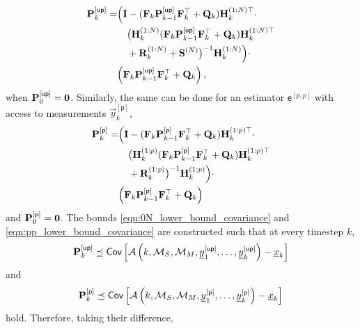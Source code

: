 \documentclass[conference]{IEEEtran}
\theoremstyle{definition}
\theoremstyle{remark}
\begin{document}
\begin{equation}\label{eqn:0N_lower_bound_covariance}
  \begin{split}
    \mat{P}_k^{[\mathsf{up}]} =& \Bigl( \mat{I} - (\mat{F}_k\mat{P}_{k-1}^{[\mathsf{up}]}\mat{F}_k^\top + \mat{Q}_k)\mat{H}_k^{(1:N)\top} \cdot \\
    &\quad\bigl(\mat{H}_k^{(1:N)}(\mat{F}_k\mat{P}_{k-1}^{[\mathsf{up}]}\mat{F}_k^\top + \mat{Q}_k)\mat{H}_k^{(1:N)\top} \\
    &\quad+ \mat{R}_k^{(1:N)} + \mat{S}^{(N)}\bigr)^{-1}\mat{H}_k^{(1:N)}\Bigr)\cdot\\
    &\Bigl(\mat{F}_k\mat{P}_{k-1}^{[\mathsf{up}]}\mat{F}_k^\top + \mat{Q}_k\Bigr)\,,
 \end{split}
\end{equation}
when ${{\mathbf{P}}}_0^{[\mathsf{up}]}={{\mathbf{0}}}$. Similarly, the same can be done for an estimator $\mathsf{e}^{[p,p]}$ with access to measurements $\vec{y}_k^{[\mathsf{p}]}$,
\begin{equation}\label{eqn:pp_lower_bound_covariance}
  \begin{split}
    \mat{P}_k^{[\mathsf{p}]} =& \Bigl( \mat{I} - (\mat{F}_k\mat{P}_{k-1}^{[\mathsf{p}]}\mat{F}_k^\top + \mat{Q}_k)\mat{H}_k^{(1:p)\top} \cdot \\
    &\quad\bigl(\mat{H}_k^{(1:p)}(\mat{F}_k\mat{P}_{k-1}^{[\mathsf{p}]}\mat{F}_k^\top + \mat{Q}_k)\mat{H}_k^{(1:p)\top} \\
    &\quad+ \mat{R}_k^{(1:p)}\bigr)^{-1}\mat{H}_k^{(1:p)}\Bigr)\cdot\\
    &\Bigl(\mat{F}_k\mat{P}_{k-1}^{[\mathsf{p}]}\mat{F}_k^\top + \mat{Q}_k\Bigr)
  \end{split}
\end{equation}
and ${{\mathbf{P}}}_0^{[\mathsf{p}]}={{\mathbf{0}}}$. The bounds \eqref{eqn:0N_lower_bound_covariance} and \eqref{eqn:pp_lower_bound_covariance} are constructed such that at every timestep $k$,
\begin{equation}
  {\ensuremath{{\mathbf{P}}}}_k^{[\mathsf{up}]} \preceq \mathsf{Cov}\left[\mathcal{A}\left(k,\mathcal{M}_S,\mathcal{M}_M,{\underline{y}}_1^{[\mathsf{up}]},\dots,{\underline{y}}_k^{[\mathsf{up}]}\right) - {\underline{x}}_k\right]
\end{equation}
and
\begin{equation}
  {\ensuremath{{\mathbf{P}}}}_k^{[\mathsf{p}]} \preceq \mathsf{Cov}\left[\mathcal{A}\left(k,\mathcal{M}_S,\mathcal{M}_M,{\underline{y}}_1^{[\mathsf{p}]},\dots,{\underline{y}}_k^{[\mathsf{p}]}\right) - {\underline{x}}_k\right]
\end{equation}
hold. Therefore, taking their difference,
\end{document}
